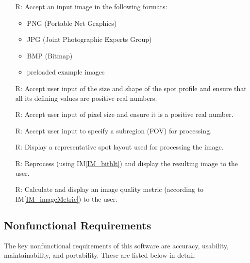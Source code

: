 \documentclass[12pt]{article}
\newcommand{\iref}[1]{IM\ref{#1}}
\newcounter{reqnum} %
\begin{document}
\noindent \begin{itemize}

\item[R\refstepcounter{reqnum}\thereqnum \label{R_Inputs}:] Accept an input 
image in the following formats:

  \noindent \begin{itemize}
    \item PNG (Portable Net Graphics)
    \item JPG (Joint Photographic Experts Group)
    \item BMP (Bitmap)
    \item preloaded example images
  \end{itemize}

\item[R\refstepcounter{reqnum}\thereqnum \label{R_userSpotProfile}:] Accept user 
input of the size and shape of the spot profile and ensure that all its defining 
values are positive real numbers.

\item[R\refstepcounter{reqnum}\thereqnum \label{R_userPixelSize}:] Accept user 
input of pixel size and ensure it is a positive real number.

\item[R\refstepcounter{reqnum}\thereqnum \label{R_subregion}:] Accept user
input to specify a subregion (FOV) for processing.

\item[R\refstepcounter{reqnum}\thereqnum \label{R_spotLayout}:] Display a 
representative spot layout used for processing the image.

\item[R\refstepcounter{reqnum}\thereqnum \label{R_resultImage}:] Reprocess 
(using \iref{IM_bitblt}) and display the resulting image to the user.

\item[R\refstepcounter{reqnum}\thereqnum \label{R_imageMetric}:] Calculate and 
display an image quality metric (according to \iref{IM_imageMetric}) to the user.

\end{itemize}

\subsection{Nonfunctional Requirements}

The key nonfunctional requirements of this software are accuracy, usability, 
maintainability, and portability. These are listed below in detail:
\end{document}
